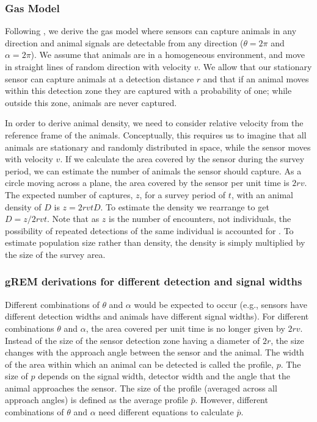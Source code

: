 \subsubsection{Gas Model}

Following \cite{yapp1956theory}, we derive the gas model where sensors can capture animals in any direction and animal signals are detectable from any direction ($\theta =  2\pi$ and $ \alpha =  2\pi$).
We assume that animals are in a homogeneous environment, and move in straight lines of random direction with velocity $v$.
We allow that our stationary sensor can capture animals at a detection distance $r$ and that if an animal moves within this detection zone they are captured with a probability of one; while outside this zone, animals are never captured.

In order to derive animal density, we need to consider relative velocity from the reference frame of the animals.
Conceptually, this requires us to imagine that all animals are stationary and randomly distributed in space, while the sensor moves with velocity $v$.
If we calculate the area covered by the sensor during the survey period, we can estimate the number of animals the sensor should capture.
As a circle moving across a plane, the area covered by the sensor per unit time is $2rv$.
The expected number of captures, $z$, for a survey period of $t$, with an animal density of $D$ is $z = 2rvtD$.
To estimate the density we rearrange to get $D = z/2rvt$.
Note that as $z$ is the number of encounters, not individuals, the possibility of repeated detections of the same individual is accounted for \cite{Hutchinson_Waser_2007}.
To estimate population size rather than density, the density is simply multiplied by the size of the survey area.


\subsubsection{gREM derivations for different detection and signal widths}
Different combinations of $\theta$ and $\alpha$ would be expected to occur (e.g., sensors have different detection widths and animals have different signal widths).
For different combinations $\theta$ and $\alpha$, the area covered per unit time is no longer given by $2rv$.
Instead of the size of the sensor detection zone having a diameter of $2r$, the size changes with the approach angle between the sensor and the animal.
The width of the area within which an animal can be detected is called the profile, $p$.
The size of $p$ depends on the signal width, detector width and the angle that the animal approaches the sensor.
The size of the profile (averaged across all approach angles) is defined as the average profile $\bar{p}$.
However, different combinations of $\theta$ and $\alpha$ need different equations to calculate $\bar{p}$. 




